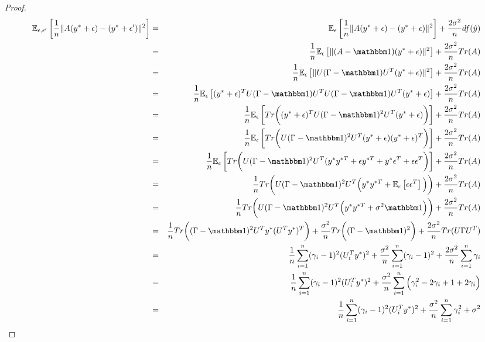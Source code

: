 \documentclass[12pt]{article}
\newcommand{\hy}{\hat{y}}
\newcommand{\eps}{\epsilon}
\begin{document}
\begin{proof}
\begin{eqnarray*}
	\expect{\epsilon,\epsilon'}{\frac{1}{n}\|A(y^*+\eps) - (y^*+\eps')\|^2} 
	&=& \expect{\epsilon}{\frac{1}{n}\|A(y^*+\eps) - (y^*+\eps)\|^2} + \frac{2\sigma^2}{n}df(\hy) \\
	&=& \frac{1}{n}\expect{\epsilon}{\|(A-\id)(y^*+\eps)\|^2} + \frac{2\sigma^2}{n}Tr(A) \\
	&=& \frac{1}{n}\expect{\epsilon}{\|U(\Gamma-\id)U^T(y^*+\eps)\|^2} + \frac{2\sigma^2}{n}Tr(A) \\
	&=& \frac{1}{n}\expect{\epsilon}{(y^*+\eps)^TU(\Gamma-\id)U^TU(\Gamma-\id)U^T(y^*+\eps)} + \frac{2\sigma^2}{n}Tr(A) \\
	&=& \frac{1}{n}\expect{\epsilon}{Tr\bigg((y^*+\eps)^TU(\Gamma-\id)^2 U^T(y^*+\eps)\bigg)} + \frac{2\sigma^2}{n}Tr(A) \\
	&=& \frac{1}{n}\expect{\epsilon}{Tr\bigg(U(\Gamma-\id)^2 U^T(y^*+\eps)(y^*+\eps)^T\bigg)} + \frac{2\sigma^2}{n}Tr(A) \\
	&=& \frac{1}{n}\expect{\epsilon}{Tr\bigg(U(\Gamma-\id)^2 U^T(y^* y^{*T} + \eps y^{*T} + y^*\eps^T + \eps \eps^T\bigg)} + \frac{2\sigma^2}{n}Tr(A) \\
	&=& \frac{1}{n}Tr\bigg(U(\Gamma-\id)^2 U^T\Big(y^* y^{*T} + \expect{\epsilon}{ \eps \eps^T}\Big)\bigg) + \frac{2\sigma^2}{n}Tr(A) \\
	&=& \frac{1}{n}Tr\bigg(U(\Gamma-\id)^2 U^T\Big(y^* y^{*T} + \sigma^2 \id \Big)\bigg) + \frac{2\sigma^2}{n}Tr(A) \\
	&=& \frac{1}{n}Tr\bigg((\Gamma-\id)^2 U^T y^* (U^T y^*)^T\bigg)  + \frac{\sigma^2}{n}Tr\bigg((\Gamma-\id)^2\bigg) + \frac{2\sigma^2}{n}Tr(U\Gamma U^T) \\
	&=& \frac{1}{n}\sum_{i=1}^n (\gamma_i-1)^2 (U_i^T y^*)^2 + \frac{\sigma^2}{n}\sum_{i=1}^n (\gamma_i-1)^2 + \frac{2\sigma^2}{n}\sum_{i=1}^n \gamma_i\\
	&=& \frac{1}{n}\sum_{i=1}^n (\gamma_i-1)^2 (U_i^T y^*)^2 + \frac{\sigma^2}{n}\sum_{i=1}^n \Big(\gamma_i^2 -2\gamma_i + 1 + 2\gamma_i\Big) \\
	&=& \frac{1}{n}\sum_{i=1}^n (\gamma_i-1)^2 (U_i^T y^*)^2 + \frac{\sigma^2}{n}\sum_{i=1}^n \gamma_i^2 + \sigma^2
\end{eqnarray*}
\end{proof}
\end{document}
